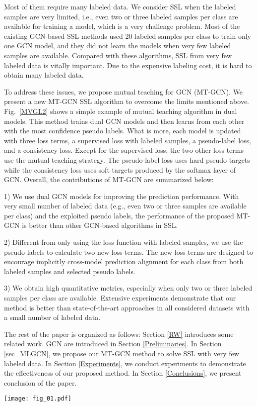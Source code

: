 \documentclass{article}
\begin{document}
Most of them require many labeled data. We consider SSL when the labeled samples are very limited, i.e., even two or three labeled samples per class are available for training a model, which is a very challenge problem. Most of the existing GCN-based SSL methods used 20 labeled samples per class to train only one GCN model, and they did not learn the models when very few labeled samples are available. Compared with these algorithms, SSL from very few labeled data is vitally important. Due to the expensive labeling cost, it is hard to obtain many labeled data.

To address these issues, we propose mutual teaching for GCN (MT-GCN). We present a new MT-GCN SSL algorithm to overcome the limits mentioned above. Fig.~\ref{MVGL2} shows a simple example of mutual teaching algorithm in dual models. This method trains dual GCN models and then learns from each other with the most confidence pseudo labels. What is more, each model is updated with three loss terms, a supervised loss with labeled samples, a pseudo-label loss, and a consistency loss. Except for the supervised loss, the two other loss terms use the mutual teaching strategy. The pseudo-label loss uses hard pseudo targets while the consistency loss uses soft targets produced by the softmax layer of GCN. Overall, the contributions of MT-GCN are summarized below:

1) We use dual GCN models for improving the prediction performance. With very small number of labeled data (e.g., even two or three samples are available per class) and the exploited pseudo labels, the performance of the proposed MT-GCN is better than other GCN-based algorithms in SSL.

2) Different from only using the loss function with labeled samples, we use the pseudo labels to calculate two new loss terms. The new loss terms are designed to encourage implicitly cross-model prediction alignment for each class from both labeled samples and selected pseudo labels.

3) We obtain high quantitative metrics, especially when only two or three labeled samples per class are available. Extensive experiments demonstrate that our method is better than state-of-the-art approaches in all considered datasets with a small number of labeled data.

The rest of the paper is organized as follows: Section \ref{RW} introduces some related work. GCN are introduced in Section \ref{Preliminaries}. In Section \ref{sec_MLGCN}, we propose our MT-GCN method to solve SSL with very few labeled data. In Section \ref{Experiments}, we conduct experiments to demonstrate the effectiveness of our proposed method. In Section \ref{Conclusions}, we present conclusion of the paper.
\begin{figure*}[ht]
\centering
\texttt{[image: fig\_01.pdf]}
\caption{A simple example of mutual teaching algorithm in dual models.}\label{MVGL2}
\end{figure*}
\end{document}
